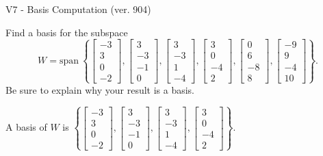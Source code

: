 \begin{exercise}
  \begin{exerciseTitle}V7 - Basis Computation (ver. 904)\end{exerciseTitle}
  \begin{exerciseStatement}
    Find a basis for the subspace 
\[W=\mathrm{span}\ \left\{\left[\begin{array}{r}
-3 \\
3 \\
0 \\
-2
\end{array}\right] , \left[\begin{array}{r}
3 \\
-3 \\
-1 \\
0
\end{array}\right] , \left[\begin{array}{r}
3 \\
-3 \\
1 \\
-4
\end{array}\right] , \left[\begin{array}{r}
3 \\
0 \\
-4 \\
2
\end{array}\right] , \left[\begin{array}{r}
0 \\
6 \\
-8 \\
8
\end{array}\right] , \left[\begin{array}{r}
-9 \\
9 \\
-4 \\
10
\end{array}\right]\right\}.\]
 Be sure to explain why your result is a basis.


  \end{exerciseStatement}
  \begin{exerciseAnswer}
   A basis of \(W\) is  \(\left\{\left[\begin{array}{r}
-3 \\
3 \\
0 \\
-2
\end{array}\right] , \left[\begin{array}{r}
3 \\
-3 \\
-1 \\
0
\end{array}\right] , \left[\begin{array}{r}
3 \\
-3 \\
1 \\
-4
\end{array}\right] , \left[\begin{array}{r}
3 \\
0 \\
-4 \\
2
\end{array}\right]\right\}\).
  


  \end{exerciseAnswer}
\end{exercise}